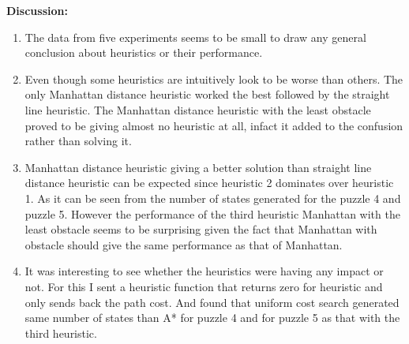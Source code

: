 \documentclass[12pt]{article}
\begin{document}
{\bf Discussion:} 
\begin{enumerate}
	\item The data from five experiments seems to be small to draw any general conclusion about heuristics or their performance.
	\item Even though some heuristics are intuitively look to be worse than others. The only Manhattan distance heuristic worked the best followed by the straight line heuristic. The Manhattan distance heuristic with the least obstacle proved to be giving almost no heuristic at all, infact it added to the confusion rather than solving it.
	\item Manhattan distance heuristic giving a better solution than straight line distance heuristic can be expected since heuristic 2 dominates over heuristic 1. As it can be seen from the number of states generated for the puzzle 4 and puzzle 5. However the performance of the third heuristic Manhattan with the least obstacle seems to be surprising given the fact that Manhattan with obstacle should give the same performance as that of Manhattan.
	\item It was interesting to see whether the heuristics were having any impact or not. For this I sent a heuristic function that returns zero for heuristic and only sends back the path cost. And found that uniform cost search generated same number of states than A* for puzzle 4 and for puzzle 5 as that with the third heuristic.
\end{enumerate}
\end{document}
